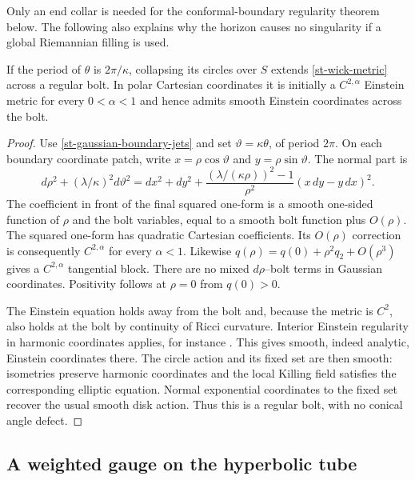 Only an end collar is needed for the conformal-boundary regularity
theorem below.  The following also explains why the horizon causes no
singularity if a global Riemannian filling is used.

\begin{lemma}
\label{st-bolt}
If the period of $\theta$ is $2\pi/\kappa$, collapsing its circles
over $S$ extends \eqref{st-wick-metric} across a regular bolt.  In
polar Cartesian coordinates it is initially a $C^{2,\alpha}$
Einstein metric for every $0<\alpha<1$ and hence admits smooth
Einstein coordinates across the bolt.
\end{lemma}

\begin{proof}
Use \eqref{st-gaussian-boundary-jets} and set
$\vartheta=\kappa\theta$, of period $2\pi$.  On each boundary
coordinate patch, write $x=\rho\cos\vartheta$ and
$y=\rho\sin\vartheta$.  The normal part is
\[
 d\rho^2+(\lambda/\kappa)^2d\vartheta^2
 =dx^2+dy^2+
 \frac{(\lambda/(\kappa\rho))^2-1}{\rho^2}
 (x\,dy-y\,dx)^2.
\]
The coefficient in front of the final squared one-form is a smooth
one-sided function of $\rho$ and the bolt variables, equal to a smooth
bolt function plus $O(\rho)$.  The squared one-form has quadratic
Cartesian coefficients.  Its $O(\rho)$ correction is consequently
$C^{2,\alpha}$ for every $\alpha<1$.  Likewise
$q(\rho)=q(0)+\rho^2q_2+O(\rho^3)$ gives a $C^{2,\alpha}$
tangential block.  There are no mixed $d\rho$--bolt terms in Gaussian
coordinates.  Positivity follows at $\rho=0$ from $q(0)>0$.

The Einstein equation holds away from the bolt and, because the
metric is $C^2$, also holds at the bolt by continuity of Ricci
curvature.  Interior Einstein regularity in harmonic coordinates
applies, for instance \cite[Theorem~5.2]{deturckkazdan1981}.
This gives smooth, indeed analytic, Einstein coordinates there.
The circle action and its fixed set are then smooth: isometries
preserve harmonic coordinates and the local Killing field satisfies
the corresponding elliptic equation.  Normal exponential coordinates
to the fixed set recover the usual smooth disk action.  Thus this is
a regular bolt, with no conical angle defect.
\end{proof}

\subsection{A weighted gauge on the hyperbolic tube}

